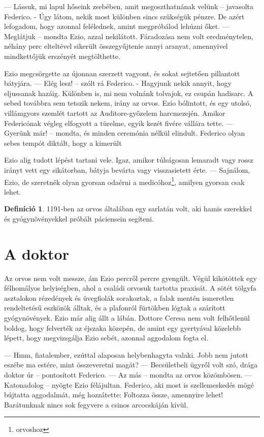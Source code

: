 \documentclass[12pt, a4paper, twoside]{report}
\theoremstyle{definition}
\newtheorem{definicio}{Definíció}[section]
\theoremstyle{remark}
\begin{document}
— Lássuk,  mi  lapul  hőseink  zsebében,  amit  megoszthatnának 
velünk -- javasolta Federico. - Úgy látom, nekik most különben sincs 
szükségük  pénzre.  De  azért  lefogadom,  hogy  azonnal  felélednek, 
amint megpróbálod lehúzni őket. 
— Meglátjuk -- mondta Ezio, azzal nekilátott. Fáradozása nem volt eredménytelen, néhány perc elteltével sikerült összegyűjtenie annyi 
aranyat,  amennyivel  mindkettőjük  erszényét  megtölthette.  

Ezio megcsörgette  az  újonnan  szerzett  vagyont,  és  sokat  sejtetően 
pillantott bátyjára. 
— Elég lesz! -- szólt rá Federico. - Hagyjunk nekik annyit, hogy eljussanak hazáig. Különben is, mi nem volnánk tolvajok, ez csupán hadisarc. A sebed továbbra sem tetszik nekem, irány az orvos. 
Ezio  bólintott,  és  egy  utolsó,  villámgyors  szemlét  tartott  az 
Auditore-győzelem  harcmezején.  Amikor  Federicónak  végleg 
elfogyott a türelme, egyik kezét fivére vállára tette. 
— Gyerünk már! -- mondta, és minden ceremónia nélkül elindult. 
Federico  olyan  sebes  tempót  diktált,  hogy  a  kimerült  

Ezio  alig tudott  lépést  tartani  vele.  Igaz,  amikor  túlságosan  lemaradt  vagy 
rossz  irányt  vett  egy  sikátorban,  bátyja  bevárta  vagy  visszasietett 
érte. 
— Sajnálom,  Ezio,  de  szeretnék  olyan  gyorsan  odaérni  a 
medicóhoz\footnote{orvoshoz}, amilyen gyorsan csak lehet. 

\begin{definicio}\label{definicio}
    1191-ben az orvos általában egy sarlatán volt, aki hamis szerekkel és gyógynövényekkel próbált páciensein segíteni.
 \end{definicio}

\section{A doktor}
Az orvos nem volt messze, ám Ezio percről percre gyengült. Végül 
kikötöttek  egy  félhomályos  helyiségben,  ahol  a  családi  orvosuk 
tartotta praxisát. A sötét tölgyfa asztalokon rézedények és üvegfiolák 
sorakoztak, a falak mentén ismeretlen rendeltetésű eszközök álltak, 
és a plafonról fürtökben lógtak a szárított gyógynövények. Ezio már 
alig állt a lábán. 
\smallskip
Dottore  Ceresa  nem  volt  felhőtlenül  boldog,  hogy  felverték  az 
éjszaka  közepén,  de  amint  egy  gyertyával  közelebb  lépett,  hogy 
megvizsgálja Ezio sebét, azonnal aggodalom fogta el.

— Hmm, fiatalember, ezúttal alaposan helybenhagyta valaki. Jobb 
nem jutott eszébe ma estére, mint összeveretni magát? 
— Becsületbeli  ügyről  volt  szó,  drága  doktor  úr  --  pontosított 
Federico. 
— Az más -- mondta az orvos közömbösen. 
— Katonadolog -- nyögte Ezio félájultan. 
Federico, aki most is szellemeskedés mögé bújtatta aggodalmát, 
még hozzátette: 
Foltozza össze, amennyire lehet! Barátunknak nincs sok fegyvere a 
csinos arcocskáján kívül. 
\end{document}
